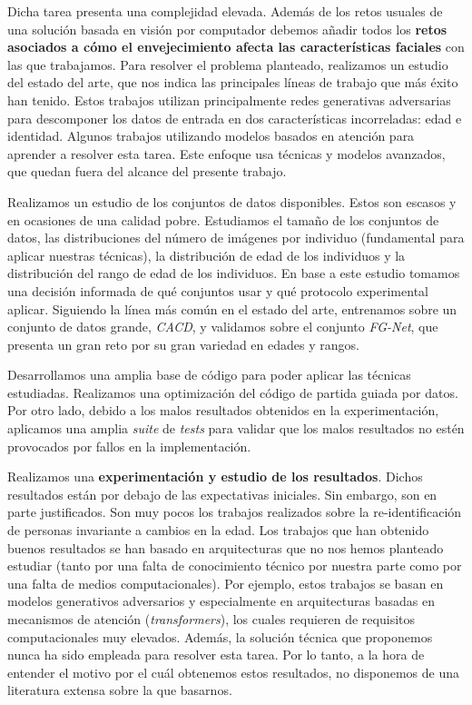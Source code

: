 Dicha tarea presenta una complejidad elevada. Además de los retos usuales de una solución basada en visión por computador debemos añadir todos los \textbf{retos asociados a cómo el envejecimiento afecta las características faciales} con las que trabajamos. Para resolver el problema planteado, realizamos un estudio del estado del arte, que nos indica las principales líneas de trabajo que más éxito han tenido. Estos trabajos utilizan principalmente redes generativas adversarias para descomponer los datos de entrada en dos características incorreladas: edad e identidad. Algunos trabajos utilizando modelos basados en atención para aprender a resolver esta tarea. Este enfoque usa técnicas y modelos avanzados, que quedan fuera del alcance del presente trabajo.

Realizamos un estudio de los conjuntos de datos disponibles. Estos son escasos y en ocasiones de una calidad pobre. Estudiamos el tamaño de los conjuntos de datos, las distribuciones del número de imágenes por individuo (fundamental para aplicar nuestras técnicas), la distribución de edad de los individuos y la distribución del rango de edad de los individuos. En base a este estudio tomamos una decisión informada de qué conjuntos usar y qué protocolo experimental aplicar. Siguiendo la línea más común en el estado del arte, entrenamos sobre un conjunto de datos grande, \textit{CACD}, y validamos sobre el conjunto \textit{FG-Net}, que presenta un gran reto por su gran variedad en edades y rangos.

Desarrollamos una amplia base de código para poder aplicar las técnicas estudiadas. Realizamos una optimización del código de partida guiada por datos. Por otro lado, debido a los malos resultados obtenidos en la experimentación, aplicamos una amplia \textit{suite} de \textit{tests} para validar que los malos resultados no estén provocados por fallos en la implementación.

Realizamos una \textbf{experimentación y estudio de los resultados}. Dichos resultados están por debajo de las expectativas iniciales. Sin embargo, son en parte justificados. Son muy pocos los trabajos realizados sobre la re-identificación de personas invariante a cambios en la edad. Los trabajos que han obtenido buenos resultados se han basado en arquitecturas que no nos hemos planteado estudiar (tanto por una falta de conocimiento técnico por nuestra parte como por una falta de medios computacionales). Por ejemplo, estos trabajos se basan en modelos generativos adversarios y especialmente en arquitecturas basadas en mecanismos de atención (\textit{transformers}), los cuales requieren de requisitos computacionales muy elevados. Además, la solución técnica que proponemos nunca ha sido empleada para resolver esta tarea. Por lo tanto, a la hora de entender el motivo por el cuál obtenemos estos resultados, no disponemos de una literatura extensa sobre la que basarnos.

